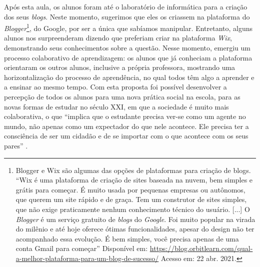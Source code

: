 \documentclass{textolivre}
\begin{document}
Após esta aula, os alunos foram até o laboratório de informática para a criação dos seus \emph{blogs}. Neste momento, sugerimos que eles os criassem na plataforma do \emph{Blogger}\footnote{Blogger e Wix são algumas das opções de plataformas para criação de blogs. “Wix é uma plataforma de criação de sites baseada na nuvem, bem simples e grátis para começar. É muito usada por pequenas empresas ou autônomos, que querem um site rápido e de graça. Tem um construtor de sites simples, que não exige praticamente nenhum conhecimento técnico do usuário. [...] O \emph{Blogger} é um serviço gratuito de \emph{blogs} do \emph{Google}. Foi muito popular na virada do milênio e até hoje oferece ótimas funcionalidades, apesar do design não ter acompanhado essa evolução. É bem simples, você precisa apenas de uma conta Gmail para começar” \cite{scotti2021} Disponível em: \url{https://blog.orbitlearn.com/qual-a-melhor-plataforma-para-um-blog-de-sucesso/} Acesso em: 22 abr. 2021.}, do Google, por ser a única que sabíamos manipular. Entretanto, alguns alunos nos surpreenderam dizendo que preferiam criar na plataforma \emph{Wix}, demonstrando seus conhecimentos sobre a questão. Nesse momento, emergiu um processo colaborativo de aprendizagem: os alunos que já conheciam a plataforma orientaram os outros alunos, inclusive a própria professora, mostrando uma horizontalização do processo de aprendência, no qual todos têm algo a aprender e a ensinar ao mesmo tempo. Com esta proposta foi possível desenvolver a percepção de todos os alunos para uma nova prática social na escola, para as novas formas de estudar no século XXI, em que a sociedade é muito mais colaborativa, o que “implica que o estudante precisa ver-se como um agente no mundo, não apenas como um expectador do que nele acontece. Ele precisa ter a consciência de ser um cidadão e de se importar com o que acontece com os seus pares” \cite[p.~104]{gomes2015}.
\end{document}
